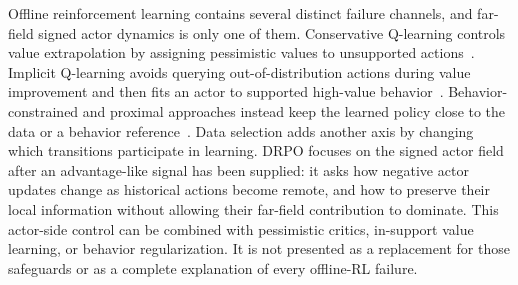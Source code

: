 Offline reinforcement learning contains several distinct failure channels, and far-field signed actor dynamics is only one of them. Conservative Q-learning controls value extrapolation by assigning pessimistic values to unsupported actions~\cite{kumar2020conservative}. Implicit Q-learning avoids querying out-of-distribution actions during value improvement and then fits an actor to supported high-value behavior~\cite{kostrikov2021offline}. Behavior-constrained and proximal approaches instead keep the learned policy close to the data or a behavior reference~\cite{fujimoto2019off,wang2020critic,zhuang2023behavior}. Data selection adds another axis by changing which transitions participate in learning. DRPO focuses on the signed actor field after an advantage-like signal has been supplied: it asks how negative actor updates change as historical actions become remote, and how to preserve their local information without allowing their far-field contribution to dominate. This actor-side control can be combined with pessimistic critics, in-support value learning, or behavior regularization. It is not presented as a replacement for those safeguards or as a complete explanation of every offline-RL failure.
